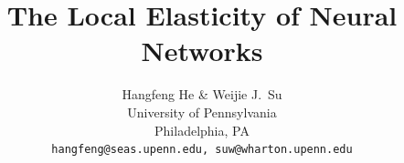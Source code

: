 \documentclass[11pt]{article}
\title{The Local Elasticity of Neural Networks}
\begin{document}
\author{Hangfeng He \& Weijie J.~Su \\
University of Pennsylvania \\
Philadelphia, PA\\
\texttt{hangfeng@seas.upenn.edu, suw@wharton.upenn.edu}
}

\maketitle
\end{document}
